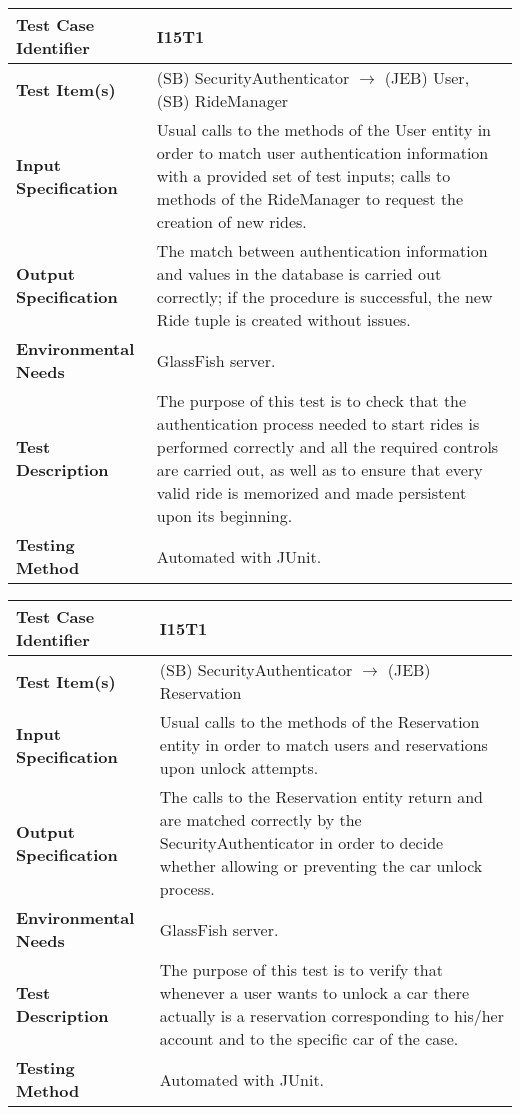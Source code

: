 \begin{longtable}{p{} | p{}}
\hline
\textbf{Test Case Identifier} & I15T1\\
\hline
\textbf{Test Item(s)} & (SB) SecurityAuthenticator $\rightarrow$ (JEB) User, (SB) RideManager \\
\hline
\textbf{Input Specification} & Usual calls to the methods of the User entity in order to match user authentication information with a provided set of test inputs; calls to methods of the RideManager to request the creation of new rides. \\
\hline
\textbf{Output Specification} & The match between authentication information and values in the database is carried out correctly; if the procedure is successful, the new Ride tuple is created without issues. \\
\hline
\textbf{Environmental Needs} & GlassFish server. \\
\hline
\textbf{Test Description} & The purpose of this test is to check that the authentication process needed to start rides is performed correctly and all the required controls are carried out, as well as to ensure that every valid ride is memorized and made persistent upon its beginning. \\
\hline
\textbf{Testing Method} & Automated with JUnit. \\
\hline
\end{longtable}

\begin{longtable}{p{} | p{}}
\hline
\textbf{Test Case Identifier} & I15T1\\
\hline
\textbf{Test Item(s)} & (SB) SecurityAuthenticator $\rightarrow$ (JEB) Reservation \\
\hline
\textbf{Input Specification} & Usual calls to the methods of the Reservation entity in order to match users and reservations upon unlock attempts. \\
\hline
\textbf{Output Specification} & The calls to the Reservation entity return and are matched correctly by the SecurityAuthenticator in order to decide whether allowing or preventing the car unlock process. \\
\hline
\textbf{Environmental Needs} & GlassFish server. \\
\hline
\textbf{Test Description} & The purpose of this test is to verify that whenever a user wants to unlock a car there actually is a reservation corresponding to his/her account and to the specific car of the case. \\
\hline
\textbf{Testing Method} & Automated with JUnit. \\
\hline
\end{longtable}

